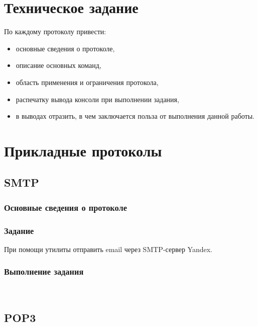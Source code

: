 





\tableofcontents
\newpage

\section{Техническое задание}

По каждому протоколу привести:

\begin{itemize}
	\item основные сведения о протоколе,
	\item описание основных команд,
	\item область применения и ограничения протокола,
	\item распечатку вывода консоли при выполнении задания,
	\item в выводах отразить, в чем заключается польза от выполнения данной работы.
\end{itemize}

\section{Прикладные протоколы}

\subsection{SMTP}

\subsubsection{Основные сведения о протоколе}

\subsubsection{Задание}

При помощи утилиты  отправить email через SMTP-сервер Yandex.

\subsubsection{Выполнение задания}\ 



\subsection{POP3}

